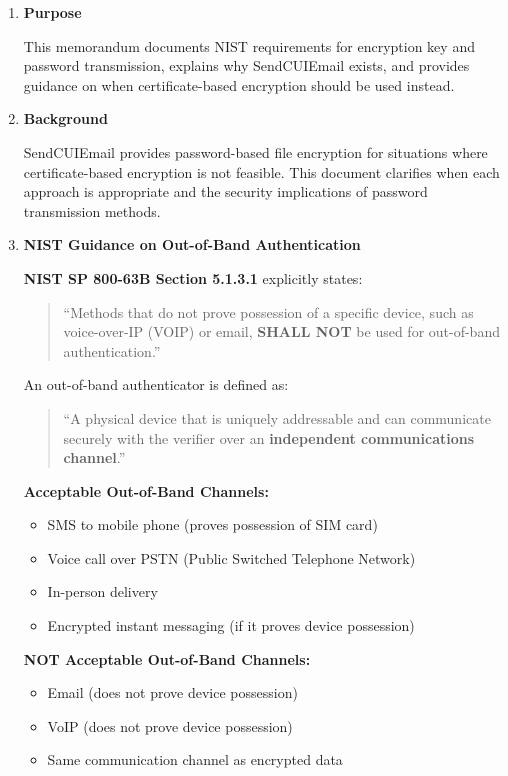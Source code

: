 \documentclass[11pt,letterpaper]{article}
\newcommand{\dmsection}[1]{\item \textbf{#1}\par}
\begin{document}
\begin{enumerate}

\dmsection{Purpose}

This memorandum documents NIST requirements for encryption key and password transmission, explains why SendCUIEmail exists, and provides guidance on when certificate-based encryption should be used instead.

\dmsection{Background}

SendCUIEmail provides password-based file encryption for situations where certificate-based encryption is not feasible. This document clarifies when each approach is appropriate and the security implications of password transmission methods.

\dmsection{NIST Guidance on Out-of-Band Authentication}

\textbf{NIST SP 800-63B Section 5.1.3.1} explicitly states:

\begin{quote}
``Methods that do not prove possession of a specific device, such as voice-over-IP (VOIP) or email, \textbf{SHALL NOT} be used for out-of-band authentication.''
\end{quote}

An out-of-band authenticator is defined as:
\begin{quote}
``A physical device that is uniquely addressable and can communicate securely with the verifier over an \textbf{independent communications channel}.''
\end{quote}

\textbf{Acceptable Out-of-Band Channels:}
\begin{itemize}
    \item SMS to mobile phone (proves possession of SIM card)
    \item Voice call over PSTN (Public Switched Telephone Network)
    \item In-person delivery
    \item Encrypted instant messaging (if it proves device possession)
\end{itemize}

\textbf{NOT Acceptable Out-of-Band Channels:}
\begin{itemize}
    \item Email (does not prove device possession)
    \item VoIP (does not prove device possession)
    \item Same communication channel as encrypted data
\end{itemize}


\end{enumerate}
\end{document}
